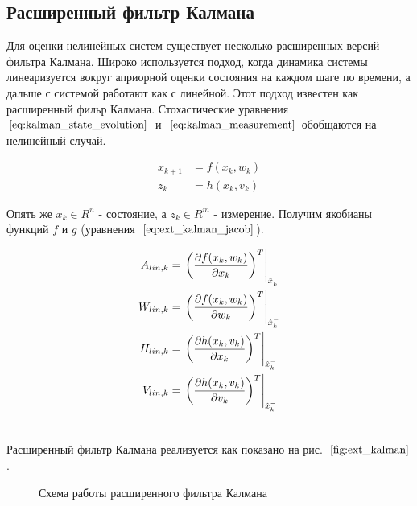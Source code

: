 \documentclass[12pt,a4paper]{article}
\begin{document}
\subsection{Расширенный фильтр Калмана}

Для оценки нелинейных систем существует несколько расширенных версий фильтра Калмана. Широко используется подход, когда динамика системы линеаризуется вокруг априорной оценки состояния на каждом шаге по времени, а дальше с системой работают как с линейной. Этот подход известен как расширенный фильр Калмана. Стохастические уравнения~$\eqref{eq:kalman_state_evolution}$~и~$\eqref{eq:kalman_measurement}$ обобщаются на нелинейный случай.

\begin{align*}
	x_{k+1} &= f(x_k,w_k) \\
	z_k &= h(x_k,v_k)
\end{align*}

Опять же $x_k \in R^n$ - состояние, а $z_k \in R^m$ - измерение. Получим якобианы функций $f$ и $g$ (уравнения~$\eqref{eq:ext_kalman_jacob}$).

\begin{subequations}
	\begin{align}
		\label{eq:ext_kalman_A} A_{lin,k} &= \left.\left( \frac{\partial f(x_k,w_k)}{\partial x_k} \right)^T\right|_{\hat x_k^-} \\
		\label{eq:ext_kalman_W} W_{lin,k} &= \left.\left( \frac{\partial f(x_k,w_k)}{\partial w_k} \right)^T\right|_{\hat x_k^-} \\
		\label{eq:ext_kalman_H} H_{lin,k} &= \left.\left( \frac{\partial h(x_k,v_k)}{\partial x_k} \right)^T\right|_{\hat x_k^-} \\
		\label{eq:ext_kalman_V} V_{lin,k} &= \left.\left( \frac{\partial h(x_k,v_k)}{\partial v_k} \right)^T\right|_{\hat x_k^-} \\
	\notag
	\end{align}
\end{subequations}


Расширенный фильтр Калмана реализуется как показано на рис.~$\ref{fig:ext_kalman}$.

\begin{figure}
	\caption{Схема работы расширенного фильтра Калмана}
	\label{fig:ext_kalman}
\end{figure}
\end{document}
